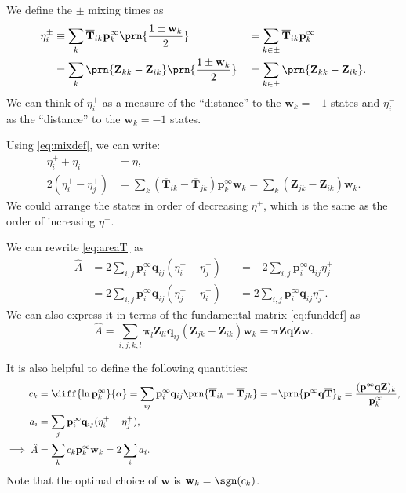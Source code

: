 \documentclass[12pt]{article}
\newcommand{\eq}{\mathbf{p}^\infty}
\newcommand{\fpt}{\mathbf{T}}
\newcommand{\fptb}{\overline{\fpt}}
\newcommand{\fund}{\mathbf{Z}}
\newcommand{\pib}{\boldsymbol{\pi}}
\newcommand{\w}{\mathbf{w}}
\newcommand{\enc}{\mathbf{q}}
\begin{document}
\begin{defn}
We define the $\pm$ mixing times as
%
\begin{equation}\label{eq:mixingpm}
\begin{aligned}
  \eta^\pm_i &\equiv \sum_k \fptb_{ik} \eq_k \prn{\frac{1 \pm \w_k}{2}}
    &&= \sum_{k\in\pm} \fptb_{ik} \eq_k \\
    &= \sum_k \prn{\fund_{kk}-\fund_{ik}} \prn{\frac{1 \pm \w_k}{2}}
    &&= \sum_{k\in\pm} \prn{\fund_{kk}-\fund_{ik}} .
\end{aligned}
\end{equation}
%
We can think of $\eta^+_i$ as a measure of the ``distance'' to the $\w_k=+1$ states and $\eta^-_i$ as the ``distance'' to the $\w_k=-1$ states.
\end{defn}
Using \eqref{eq:mixdef}, we can write:
%
\begin{equation}\label{eq:mixingrels}
\begin{aligned}
  \eta^+_i + \eta^-_i &= \eta,\\
  2(\eta^+_i - \eta^+_j) &= \sum_k (\fptb_{ik}-\fptb_{jk}) \eq_k \w_k
    = \sum_k (\fund_{jk}-\fund_{ik}) \w_k.
\end{aligned}
\end{equation}
%
We could arrange the states in order of decreasing $\eta^+$, which is the same as the order of increasing $\eta^-$.

We can rewrite \eqref{eq:areaT} as
%
\begin{equation}\label{eq:areaEta}
\begin{aligned}
  \hat{A} &= 2\sum_{i,j} \eq_i \enc_{ij} (\eta^+_{i} - \eta^+_{j}) &
    &= -2\sum_{i,j} \eq_i \enc_{ij} \eta^+_{j} \\
    &= 2\sum_{i,j} \eq_i \enc_{ij} (\eta^-_{j} - \eta^-_{i}) &
    &= 2\sum_{i,j} \eq_i \enc_{ij} \eta^-_{j}.
\end{aligned}
\end{equation}
%
We can also express it in terms of the fundamental matrix \eqref{eq:funddef} as
%
\begin{equation}\label{eq:areaZ}
  \hat{A} = \sum_{i,j,k,l} \pib_{l} \fund_{li} \enc_{ij} (\fund_{jk}-\fund_{ik}) \w_k
    = \pib \fund \enc \fund \w.
\end{equation}
%

It is also helpful to define the following quantities:
%
\begin{equation}\label{eq:areacoeffs}
  \begin{aligned}
    c_k &= \diff{\ln\eq_k}{\alpha}
      = \sum_{ij} \eq_i \enc_{ij} \prn{\fptb_{ik}-\fptb_{jk}}
      = - \prn{\eq \enc \fptb}_k
      = \frac{(\eq \enc \fund)_k}{\eq_k}, \\
    a_i &= \sum_j \eq_i \enc_{ij} (\eta^+_{i} - \eta^+_{j}),\\
    \implies
    \hat{A} &= \sum_k c_k \eq_k \w_k
      = 2\sum_i a_i.
  \end{aligned}
\end{equation}
%
Note that the optimal choice of $\w$ is $\w_k = \sgn(c_k)$.
\end{document}
